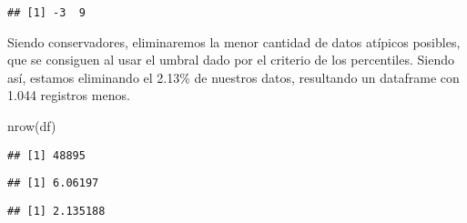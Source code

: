 \documentclass[
]{book}
\newenvironment{Shaded}{\begin{snugshade}}{\end{snugshade}}
\newcommand{\DecValTok}[1]{\textcolor[rgb]{0.00,0.00,0.81}{#1}}
\newcommand{\FloatTok}[1]{\textcolor[rgb]{0.00,0.00,0.81}{#1}}
\newcommand{\FunctionTok}[1]{\textcolor[rgb]{0.00,0.00,0.00}{#1}}
\newcommand{\NormalTok}[1]{#1}
\newcommand{\SpecialCharTok}[1]{\textcolor[rgb]{0.00,0.00,0.00}{#1}}
\begin{document}
\begin{verbatim}
## [1] -3  9
\end{verbatim}

Siendo conservadores, eliminaremos la menor cantidad de datos atípicos posibles, que se consiguen al usar el umbral dado por el criterio de los percentiles. Siendo así, estamos eliminando el 2.13\% de nuestros datos, resultando un dataframe con 1.044 registros menos.

\begin{Shaded}
\begin{Highlighting}[]
\FunctionTok{nrow}\NormalTok{(df)}
\end{Highlighting}
\end{Shaded}

\begin{verbatim}
## [1] 48895
\end{verbatim}

\begin{Shaded}
\end{Shaded}

\begin{verbatim}
## [1] 6.06197
\end{verbatim}

\begin{Shaded}
\end{Shaded}

\begin{verbatim}
## [1] 2.135188
\end{verbatim}

\begin{Shaded}
\end{Shaded}
\end{document}
